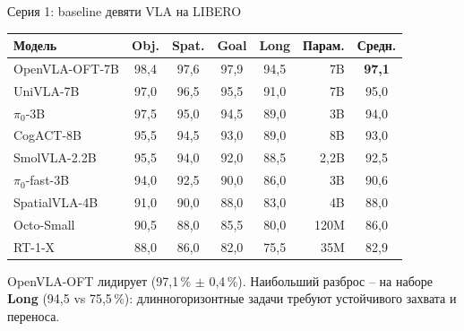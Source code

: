 \documentclass[aspectratio=169,13pt]{beamer}
\begin{document}
\begin{frame}{Серия 1: baseline девяти VLA на LIBERO}
  \centering
  \scriptsize
  \setlength{\tabcolsep}{4pt}
  \renewcommand{\arraystretch}{1.15}
  \begin{tabular}{lccccrc}
    \toprule
    \textbf{Модель} & \textbf{Obj.} & \textbf{Spat.} & \textbf{Goal} & \textbf{Long} & \textbf{Парам.} & \textbf{Средн.} \\
    \midrule
    OpenVLA-OFT-7B  & 98,4 & 97,6 & 97,9 & 94,5 & 7B   & \textbf{97,1} \\
    UniVLA-7B       & 97,0 & 96,5 & 95,5 & 91,0 & 7B   & 95,0 \\
    $\pi_0$-3B      & 97,5 & 95,0 & 94,5 & 89,0 & 3B   & 94,0 \\
    CogACT-8B       & 95,5 & 94,5 & 93,0 & 89,0 & 8B   & 93,0 \\
    SmolVLA-2.2B    & 95,5 & 94,0 & 92,0 & 88,5 & 2,2B & 92,5 \\
    $\pi_0$-fast-3B & 94,0 & 92,5 & 90,0 & 86,0 & 3B   & 90,6 \\
    SpatialVLA-4B   & 91,0 & 90,0 & 88,0 & 83,0 & 4B   & 88,0 \\
    Octo-Small      & 90,5 & 88,0 & 85,5 & 80,0 & 120M & 86,0 \\
    RT-1-X          & 88,0 & 86,0 & 82,0 & 75,5 & 35M  & 82,9 \\
    \bottomrule
  \end{tabular}

  \vspace{4pt}
  {\small OpenVLA-OFT лидирует (97,1\,\% $\pm$ 0,4\,\%). Наибольший разброс -- на наборе \textbf{Long} (94,5 vs 75,5\,\%): длинногоризонтные задачи требуют устойчивого захвата и переноса.}
\end{frame}
\end{document}
